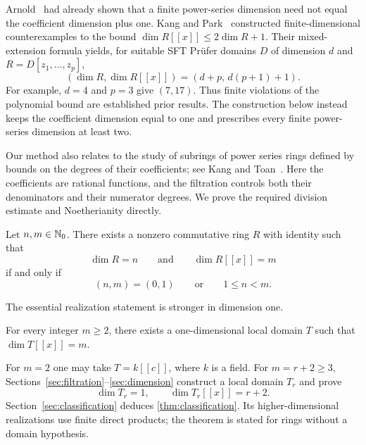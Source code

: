 Arnold~\cite{Arnold1981} had already shown that a finite
power-series dimension need not equal the coefficient dimension
plus one. Kang and Park~\cite{KangPark2009} constructed finite-dimensional
counterexamples to the bound $\dim R[[x]]\le2\dim R+1$.
Their mixed-extension formula yields, for suitable SFT Pr\"ufer
domains $D$ of dimension $d$ and $R=D[z_1,\ldots,z_p]$,
\[
 (\dim R,\dim R[[x]])=(d+p,\,d(p+1)+1).
\]
For example, $d=4$ and $p=3$ give $(7,17)$.
Thus finite violations of the polynomial bound are established
prior results. The construction below instead keeps the coefficient
dimension equal to one and prescribes every finite power-series
dimension at least two.

Our method also relates to the study of subrings of power series
rings defined by bounds on the degrees of their coefficients; see
Kang and Toan~\cite{KangToan2015a,KangToan2015b}.
Here the coefficients are rational functions, and the filtration
controls both their denominators and their numerator degrees.
We prove the required division estimate and Noetherianity directly.

\begin{theorem}\label{thm:classification}
Let $n,m\in\mathbb N_0$. There exists a nonzero commutative ring $R$ with
identity such that
\[
 \dim R=n\qquad\text{and}\qquad\dim R[[x]]=m
\]
if and only if
\[
 (n,m)=(0,1)\qquad\text{or}\qquad 1\le n<m.
\]
\end{theorem}

The essential realization statement is stronger in dimension one.

\begin{theorem}\label{thm:local}
For every integer $m\ge2$, there exists a one-dimensional local
domain $T$ such that $\dim T[[x]]=m$.
\end{theorem}

For $m=2$ one may take $T=k[[c]]$, where $k$ is a field.
For $m=r+2\ge3$, Sections~\ref{sec:filtration}--\ref{sec:dimension}
construct a local domain $T_r$ and prove
\begin{equation}\label{eq:target}
 \dim T_r=1,\qquad \dim T_r[[x]]=r+2.
\end{equation}
Section~\ref{sec:classification} deduces
\cref{thm:classification}. Its higher-dimensional realizations use
finite direct products; the theorem is stated for rings without a
domain hypothesis.
